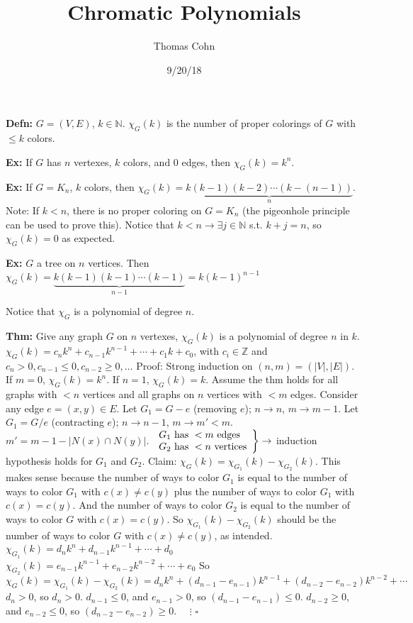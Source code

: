 \documentclass[10pt,letterpaper]{article}
\author{Thomas Cohn}
\title{Chromatic Polynomials}
\date{9/20/18} %
\newcommand{\n}{\hfill\break}
\newcommand{\defn}[1]{\par\noindent\settowidth{\hangindent}{\textbf{Defn: }}\textbf{Defn: }#1\n}
\newcommand{\thm}[1]{\par\noindent\settowidth{\hangindent}{\textbf{Thm: }}\textbf{Thm: }#1\n}
\newcommand{\ex}[1]{\par\noindent\settowidth{\hangindent}{\textbf{Ex: }}\textbf{Ex: }#1\n}
\newcommand{\proven}{\;$\square$\n}
\newcommand{\ptxt}[1]{\textrm{\textnormal{#1}}}
\newcommand{\card}[1]{\left|#1\right|}
\newcommand{\naturals}{\mathbb{N}}
\newcommand{\N}{\naturals}
\newcommand{\integers}{\mathbb{Z}}
\newcommand{\Z}{\integers}
\newcommand{\st}{s.t.}
\begin{document}
\maketitle
\setlength\RaggedRightParindent{\parindent}
\RaggedRight

\defn{$G=(V,E)$, $k\in\N$.\n
$\chi_{G}(k)$ is the number of proper colorings of $G$ with $\le{}k$ colors.}

\ex{If $G$ has $n$ vertexes, $k$ colors, and $0$ edges, then $\chi_{G}(k)=k^{n}$.}

\ex{If $G=K_{n}$, $k$ colors, then $\chi_{G}(k)=\underbrace{k(k-1)(k-2)\cdots(k-(n-1))}_{n}$.\n
Note: If $k<n$, there is no proper coloring on $G=K_{n}$ (the pigeonhole principle can be used to prove this). Notice that $k<n\to\exists{}j\in\N$ \st{} $k+j=n$, so $\chi_{G}(k)=0$ as expected.}

\ex{$G$ a tree on $n$ vertices. Then $\chi_{G}(k)=\underbrace{k(k-1)(k-1)\cdots(k-1)}_{n-1}=k(k-1)^{n-1}$}

\par\noindent Notice that $\chi_{G}$ is a polynomial of degree $n$.\n

\thm{Give any graph $G$ on $n$ vertexes, $\chi_{G}(k)$ is a polynomial of degree $n$ in $k$.\n
$\chi_{G}(k)=c_{n}k^{n}+c_{n-1}k^{n-1}+\cdots+c_{1}k+c_{0}$, with $c_{i}\in\Z$ and $c_{n}>0,c_{n-1}\le{}0,c_{n-2}\ge{}0,\ldots$\n
Proof: Strong induction on $(n,m)=(\card{V},\card{E})$. If $m=0$, $\chi_{G}(k)=k^{n}$. If $n=1$, $\chi_{G}(k)=k$.\n
Assume the thm holds for all graphs with $<n$ vertices and all graphs on $n$ vertices with $<m$ edges.\n
Consider any edge $e=(x,y)\in{}E$.\n
Let $G_{1}=G-e$ (removing $e$); $n\to{}n$, $m\to{}m-1$.\n
Let $G_{1}=G/e$ (contracting $e$); $n\to{}n-1$, $m\to{}m'<m$. $m'=m-1-\card{N(x)\cap{}N(y)}$.\n
$\left.\begin{array}{l}G_{1}\ptxt{ has }<m\ptxt{ edges}\\ G_{2}\ptxt{ has }<n\ptxt{ vertices}\end{array}\right\}\to$ induction hypothesis holds for $G_{1}$ and $G_{2}$.\n
\n
Claim: $\chi_{G}(k)=\chi_{G_{1}}(k)-\chi_{G_{2}}(k)$. This makes sense because the number of ways to color $G_{1}$ is equal to the number of ways to color $G_{1}$ with $c(x)\ne{}c(y)$ plus the number of ways to color $G_{1}$ with $c(x)=c(y)$. And the number of ways to color $G_{2}$ is equal to the number of ways to color $G$ with $c(x)=c(y)$. So $\chi_{G_{1}}(k)-\chi_{G_{2}}(k)$ should be the number of ways to color $G$ with $c(x)\ne{}c(y)$, as intended.\n
\n
$\chi_{G_{1}}(k)=d_{n}k^{n}+d_{n-1}k^{n-1}+\cdots+d_{0}$\n
$\chi_{G_{2}}(k)=e_{n-1}k^{n-1}+e_{n-2}k^{n-2}+\cdots+e_{0}$\n
So $\chi_{G}(k)=\chi_{G_{1}}(k)-\chi_{G_{2}}(k)=d_{n}k^{n}+(d_{n-1}-e_{n-1})k^{n-1}+(d_{n-2}-e_{n-2})k^{n-2}+\cdots$\n
\n
$d_{n}>0$, so $d_{n}>0$.\n
$d_{n-1}\le{}0$, and $e_{n-1}>0$, so $(d_{n-1}-e_{n-1})\le{}0$.\n
$d_{n-2}\ge{}0$, and $e_{n-2}\le{}0$, so $(d_{n-2}-e_{n-2})\ge{}0$.\n
${}\quad\vdots$\n
\proven}
\end{document}
